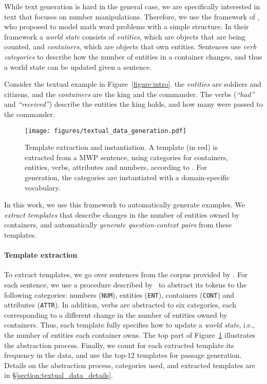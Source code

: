 \documentclass[11pt,a4paper]{article}
\newcommand\nl[1]{{\it``#1''}}
\begin{document}
While text generation is hard in the general case, we are specifically interested in text that focuses on number manipulations. Therefore, we use the framework of \citet{hosseini2014learning}, who proposed to model math word problems with a simple structure. In their framework a \emph{world state} consists of \emph{entities}, which are objects that are being counted, and \emph{containers}, which are objects that own entities. Sentences use \emph{verb categories} to describe how the number of entities in a container changes, and thus a world state can be updated given a sentence.

Consider the textual example in Figure~\ref{figure:intro}. the \emph{entities} are soldiers and citizens, and the \emph{containers} are the king and the commander. The verbs (\nl{had} and \nl{received}) describe the entities the king holds, and how many were passed to the commander.



\begin{figure}
\setlength{\belowcaptionskip}{-15pt}
    \centering
    \texttt{[image: figures/textual\_data\_generation.pdf]}
    \caption{Template extraction and instantiation.
    A template (in red) is extracted from a MWP sentence, using categories for containers, entities, verbs, attributes and numbers, according to \citet{hosseini2014learning}. For generation, the categories are instantiated with a domain-specific vocabulary.}
    \label{figure:textual_data_generation}
\end{figure}

In this work, we use this framework to automatically generate examples. We \emph{extract templates} that describe changes in the number of entities owned by containers, and automatically \emph{generate question-context pairs} from these templates.

\paragraph{Template extraction}
To extract templates, we go over sentences from the corpus provided by \citet{hosseini2014learning}. For each sentence, we use a procedure described by~\citet{hosseini2014learning}
to abstract its tokens to the following categories:
numbers (\texttt{NUM}), entities (\texttt{ENT}), containers (\texttt{CONT}) and attributes (\texttt{ATTR}). 
In addition, verbs are abstracted to six categories, each corresponding to a different change in the number of entities owned by containers.
Thus, each template fully specifies how to update a \emph{world state}, i.e., the number of entities each container owns. 
The top part of Figure~\ref{figure:textual_data_generation} illustrates the abstraction process.
Finally, we count for each extracted template its frequency in the data, and use the top-$12$ templates for passage generation.
Details on the abstraction process, categories used, and extracted templates are in \S\ref{section:textual_data_details}.
\end{document}
